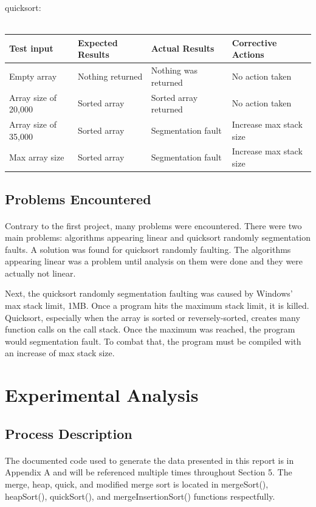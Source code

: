 \documentclass[onecolumn, letterpaper, 12pt]{article}
\begin{document}
		\noindent quicksort:\\\\
		\small{\begin{tabular}{|l|l|l|l|}
		\hline Test input & Expected Results & Actual Results & Corrective Actions \\
		\hline Empty array & Nothing returned & Nothing was returned & No action taken \\
		\hline Array size of 20,000 & Sorted array & Sorted array returned & No action taken \\
		\hline Array size of 35,000 & Sorted array & Segmentation fault & Increase max stack size \\
		\hline Max array size & Sorted array & Segmentation fault & Increase max stack size \\
		\hline
		\end{tabular}}
	\normalsize
	\subsection{Problems Encountered}
		\paragraph{}
		Contrary to the first project, many problems were encountered. There were two main problems: algorithms appearing linear and quicksort randomly segmentation faults. A solution was found for quicksort randomly faulting. The algorithms appearing linear was a problem until analysis on them were done and they were actually not linear.
		
		Next, the quicksort randomly segmentation faulting was caused by Windows' max stack limit, 1MB. Once a program hits the maximum stack limit, it is killed. Quicksort, especially when the array is sorted or reversely-sorted, creates many function calls on the call stack. Once the maximum was reached, the program would segmentation fault. To combat that, the program must be compiled with an increase of max stack size.

\section{Experimental Analysis}
	\normalsize
	\subsection{Process Description}
		\paragraph{}
		The documented code used to generate the data presented in this report is in Appendix A and will be referenced multiple times throughout Section 5. The merge, heap, quick, and modified merge sort is located in mergeSort(), heapSort(), quickSort(), and mergeInsertionSort() functions respectfully. 
		
\end{document}
